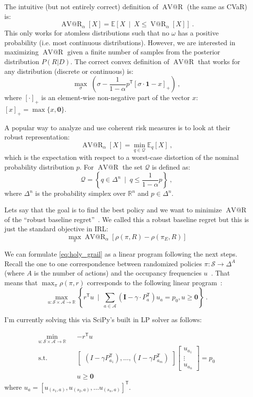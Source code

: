 \documentclass{article}
\makeatletter
\newcommand{\tr}{^\mathsf{T}}
\DeclareMathOperator{\var}{V@R}
\DeclareMathOperator{\avar}{AV@R}
\newcommand{\Ex}{\mathbb{E}}
\newcommand{\one}{\mathbf{1}}
\newcommand{\zero}{\mathbf{0}}
\newcommand{\eye}{\mathbf{I}}
\newcommand{\states}{\mathcal{S}}
\newcommand{\actions}{\mathcal{A}}
\newcommand{\Real}{\mathbb{R}}
\makeatother
\begin{document}
	The intuitive (but not entirely correct) definition of $\avar$ (the same as CVaR) is:
	\[ \avar_\alpha[X] = \Ex\left[ X ~\mid~ X \le \var_\alpha[X]\right] ~.\]
	This only works for atomless distributions such that no $\omega$ has a positive probability (i.e. most continuous distributions). However, we are interested in maximizing $\avar$ given a finite number of samples from the posterior distribution $P(R|D)$. The correct convex definition of $\avar$ that works for any distribution (discrete or continuous) is:
	\[ \max_{\sigma}\; \left( \sigma - \frac{1}{1-\alpha} p\tr [\sigma \cdot \one - x ]_+ \right) ~,\]
	where $[\cdot]_+$ is an element-wise non-negative part of the vector $x$: $[x]_+ = \max \{x, \zero\}$. 
	
	
	
	A popular way to analyze and use coherent risk measures is to look at their robust representation:
	\[ \avar_\alpha[X] = \min_{q\in\mathcal{Q}} \Ex_q[X]~, \]
	which is the expectation with respect to a worst-case distortion of the nominal probability distribution $p$. For $\avar$ the set $\mathcal{Q}$ is defined as:
	\[ \mathcal{Q} = \left\{ q \in \Delta^n ~\mid~ q \le \frac{1}{1-\alpha} p \right\} ~, \]
	where $\Delta^n$ is the probability simplex over $\mathbb{R}^n$ and $p \in \Delta^n$.
	
	Lets say that the goal is to find the best policy and we want to minimize $\avar$ of the ``robust baseline regret''~\cite{Ho2016,Petrik2016,Syed2008}. We called this a robust baseline regret but this is just the standard objective in IRL:
	\begin{equation} \label{eq:holy_grail}
	\max_{\pi} \avar_\alpha\left[ \rho(\pi, R) - \rho(\pi_E, R) \right] 
	\end{equation}
	
	
	We can formulate \eqref{eq:holy_grail} as a linear program following the next steps. Recall the one to one correspondence between randomized policies $\pi: \mathcal{S} \to \Delta^A$ (where $A$ is the number of actions) and the occupancy frequencies $u$~\cite{Puterman2005}. That means that $\max_{\pi} \rho(\pi, r)$ corresponds to the following linear program~\cite{Puterman2005}:
	\[\max_{u:\states\times\actions\to\Real} \left\{ r\tr u ~\mid~ \sum_{a\in\mathcal{A}} (\eye - \gamma\cdot P_a\tr) u_a = p_0, u \ge \zero \right\}~. \]
	
I'm currently solving this via SciPy's built in LP solver as follows:

\begin{eqnarray}
\min_{u:\states\times\actions\to\Real}&& -r\tr u \\
\text{s.t.}&&\begin{bmatrix}
(I - \gamma P_{a_1}\tr), \ldots, (I - \gamma P_{a_m}\tr)
\end{bmatrix}
\begin{bmatrix}
u_{a_1} \\
\vdots\\
u_{a_n}
\end{bmatrix}
= p_0 \\
&& u \geq \zero
\end{eqnarray}
where $u_{a} = [u_{(s_1, a)}, u_{(s_2, a)}, \ldots u_{(s_n, a)}]\tr$. 
\end{document}
